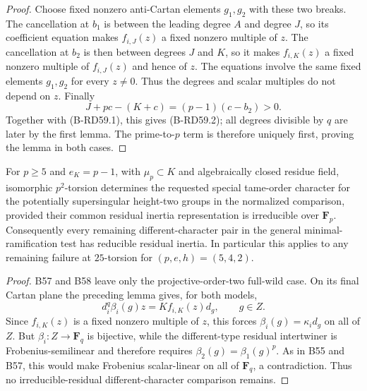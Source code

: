 \begin{proof}
Choose fixed nonzero anti-Cartan elements $g_1,g_2$ with these
two breaks. The cancellation at $b_1$ is between the leading
degree $A$ and degree $J$, so its coefficient equation makes
$f_{i,J}(z)$ a fixed nonzero multiple of $z$.
The cancellation at $b_2$ is then between degrees $J$ and $K$,
so it makes $f_{i,K}(z)$ a fixed nonzero multiple of
$f_{i,J}(z)$ and hence of $z$. The equations involve the same
fixed elements $g_1,g_2$ for every $z\ne0$. Thus the degrees
and scalar multiples do not depend on $z$.
Finally
\[
                  J+pc-(K+c)=(p-1)(c-b_2)>0.
\]
Together with (B-RD59.1), this gives (B-RD59.2); all degrees
divisible by $q$ are later by the first lemma. The prime-to-$p$
term is therefore uniquely first, proving the lemma in both cases.
\end{proof}

\begin{theorem}
\label{thm:B-RD59}
For $p\ge5$ and $e_K=p-1$, with $\mu_p\subset K$ and algebraically
closed residue field, isomorphic $p^2$-torsion determines the
requested special tame-order character for the potentially
supersingular height-two groups in the normalized comparison,
provided their common residual inertia representation is irreducible
over $\mathbf F_p$.
Consequently every remaining different-character pair in the general
minimal-ramification test has reducible residual inertia.
In particular this applies to any remaining failure at $25$-torsion
for $(p,e,h)=(5,4,2)$.
\end{theorem}
\begin{proof}
B57 and B58 leave only the projective-order-two full-wild case.
On its final Cartan plane the preceding lemma gives, for both models,
\[
                   d_i^q\beta_i(g)z=K f_{i,K}(z)d_g,
                     \qquad g\in Z.                   \tag{B-RD59.8}
\]
Since $f_{i,K}(z)$ is a fixed nonzero multiple of $z$, this
forces $\beta_i(g)=\kappa_i d_g$ on all of $Z$.
But $\beta_i:Z\to\mathbf F_q$ is bijective, while the
different-type residual intertwiner is Frobenius-semilinear and
therefore requires $\beta_2(g)=\beta_1(g)^p$.
As in B55 and B57, this would make Frobenius scalar-linear on
all of $\mathbf F_q$, a contradiction.
Thus no irreducible-residual different-character comparison remains.
\end{proof}

